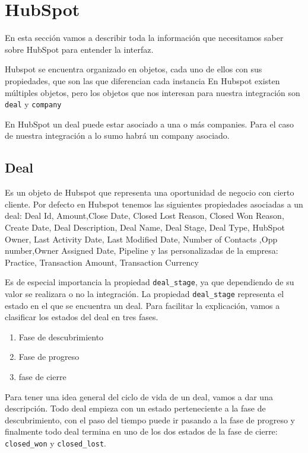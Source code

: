 \section{HubSpot}
En esta sección vamos a describir toda la información que necesitamos saber sobre HubSpot para entender la interfaz.

Hubspot se encuentra organizado en objetos, cada uno de ellos con sus propiedades, que son las que diferencian cada instancia
En Hubspot existen múltiples objetos, pero los objetos que nos interesan para nuestra integración son \verb|deal| y \verb|company|



En HubSpot un deal puede estar asociado a una o más companies. Para el caso de nuestra integración a lo sumo habrá un company asociado.

\subsection{Deal}
	Es un objeto de Hubspot que representa una oportunidad de negocio con cierto cliente. Por defecto en Hubspot tenemos las siguientes propiedades asociadas a un deal:			
		Deal Id, Amount,Close Date, Closed Lost Reason, Closed Won Reason, Create Date, Deal Description, Deal Name, Deal Stage, Deal Type, HubSpot Owner, Last Activity Date, Last Modified Date, Number of Contacts
		,Opp number,Owner Assigned Date, Pipeline y las personalizadas de la empresa: Practice, Transaction Amount, Transaction Currency
		
		Es de especial importancia la propiedad \verb|deal_stage|, ya que dependiendo de su valor se realizara o no la integración.
		La propiedad \verb|deal_stage| representa el estado en el que se encuentra un deal. Para facilitar la explicación, vamos a clasificar los estados del deal en tres fases.
		\begin{enumerate}
			\item Fase de descubrimiento
			\item Fase de progreso 
			\item fase de cierre
		\end{enumerate}
		Para tener una idea general del ciclo de vida de un deal, vamos a dar una descripción. Todo deal empieza con un estado perteneciente a la fase de descubrimiento, con el paso del tiempo puede ir pasando a la fase de progreso y finalmente todo deal termina en uno de los dos estados de la fase de cierre: \verb|closed_won| y \verb|closed_lost|.
		
		
			
